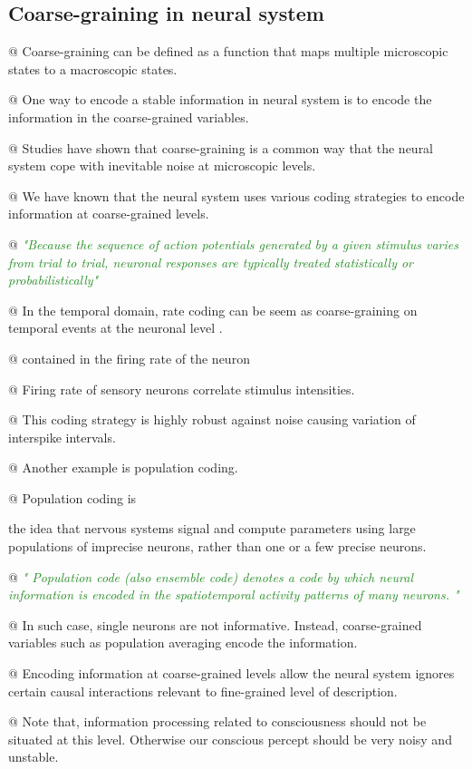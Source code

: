 \documentclass[utf8]{article}
\newenvironment{ants}
			{
			 \begin{easylist}[itemize]		
		 	}
			{
			\end{easylist}
			}
\newcommand{\rewrite}[1]{\textcolor{ForestGreen}{\textit{"#1"}}\newline}
\begin{document}
		\subsection{Coarse-graining in neural system}
			\begin{ants}
				
				@ Coarse-graining can be defined as a function that maps multiple microscopic states to a macroscopic states. 
				
				@ One way to encode a stable information in neural system is to encode the information in the coarse-grained variables. 
				
				@ Studies have shown that coarse-graining is a common way that the neural system cope with inevitable noise at microscopic levels. 
				
				@ We have known that the neural system uses various coding strategies to encode information at coarse-grained levels. 

				@ \rewrite{Because the sequence of action potentials generated by a given stimulus varies from trial to trial, neuronal responses are typically treated statistically or probabilistically}
				
				@ In the temporal domain, rate coding can be seem as coarse-graining on temporal events at the neuronal level \cite{stein2005neuronal}.
				
				@ contained in the firing rate of the neuron 
				
				@ Firing rate of sensory neurons correlate stimulus intensities.  \citep{kandel2000principles}
				
				@ This coding strategy is highly robust against noise causing variation of interspike intervals. 
				
				@ Another example is population coding. 
						
				@ Population coding is 
				
				the idea that nervous systems signal and compute parameters using large populations of imprecise neurons, rather than one or a few precise neurons. 		
				
				@ \rewrite{
						Population code (also ensemble code) denotes a code by which neural information is encoded in the spatiotemporal activity patterns of many neurons.
					} \cite{binder2009encyclopedia}					
				
				@ In such case, single neurons are not informative. Instead, coarse-grained variables such as population averaging encode the information. 
				

				@ Encoding information at coarse-grained levels allow the neural system ignores certain causal interactions relevant to fine-grained level of description. \cite{price2007causation}
				
				@ Note that, information processing related to consciousness should not be situated at this level. Otherwise our conscious percept should be very noisy and unstable.

			\end{ants}
				
\end{document}
